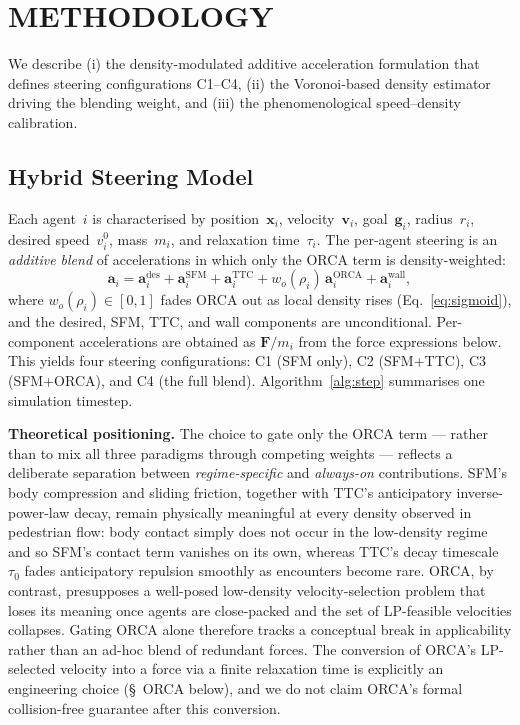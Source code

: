 \documentclass[a4paper,twoside]{article}
\begin{document}
\section{\uppercase{Methodology}}
\label{sec:framework}

We describe (i) the density-modulated additive acceleration formulation that defines steering configurations C1--C4, (ii) the Voronoi-based density estimator driving the blending weight, and (iii) the phenomenological speed--density calibration.

\subsection{Hybrid Steering Model}
\label{sec:hybrid}

Each agent~$i$ is characterised by position~$\mathbf{x}_i$, velocity~$\mathbf{v}_i$, goal~$\mathbf{g}_i$, radius~$r_i$, desired speed~$v_i^0$, mass~$m_i$, and relaxation time~$\tau_i$. The per-agent steering is an \emph{additive blend} of accelerations in which only the ORCA term is density-weighted:
\begin{equation}\label{eq:hybrid}
    \mathbf{a}_i = \mathbf{a}_i^{\text{des}} + \mathbf{a}_i^{\text{SFM}} + \mathbf{a}_i^{\text{TTC}} + w_o(\rho_i)\,\mathbf{a}_i^{\text{ORCA}} + \mathbf{a}_i^{\text{wall}},
\end{equation}
where $w_o(\rho_i)\!\in\![0,1]$ fades ORCA out as local density rises (Eq.~\ref{eq:sigmoid}), and the desired, SFM, TTC, and wall components are unconditional. Per-component accelerations are obtained as $\mathbf{F}/m_i$ from the force expressions below. This yields four steering configurations: C1 (SFM only), C2 (SFM+TTC), C3 (SFM+ORCA), and C4 (the full blend). Algorithm~\ref{alg:step} summarises one simulation timestep.

\textbf{Theoretical positioning.}
The choice to gate only the ORCA term --- rather than to mix all three paradigms through competing weights --- reflects a deliberate separation between \emph{regime-specific} and \emph{always-on} contributions. SFM's body compression and sliding friction, together with TTC's anticipatory inverse-power-law decay, remain physically meaningful at every density observed in pedestrian flow: body contact simply does not occur in the low-density regime and so SFM's contact term vanishes on its own, whereas TTC's decay timescale $\tau_0$ fades anticipatory repulsion smoothly as encounters become rare. ORCA, by contrast, presupposes a well-posed low-density velocity-selection problem that loses its meaning once agents are close-packed and the set of LP-feasible velocities collapses. Gating ORCA alone therefore tracks a conceptual break in applicability rather than an ad-hoc blend of redundant forces. The conversion of ORCA's LP-selected velocity into a force via a finite relaxation time is explicitly an engineering choice (\S~ORCA below), and we do not claim ORCA's formal collision-free guarantee after this conversion.
\end{document}

